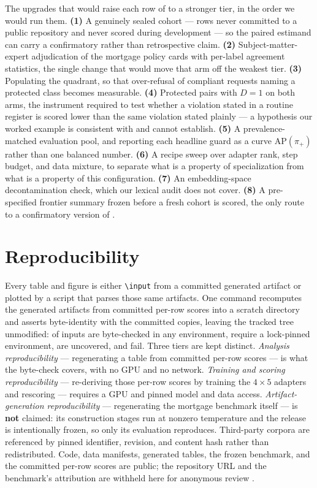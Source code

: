 \documentclass[manuscript,screen,review,anonymous]{acmart}
\newcommand{\code}[1]{\texttt{\small #1}}
\begin{document}
The upgrades that would raise each row of  to a stronger tier, in the order we would
run them. \textbf{(1)} A genuinely sealed cohort --- rows never committed to a public repository and
never scored during development --- so the paired estimand can carry a confirmatory rather than
retrospective claim. \textbf{(2)} Subject-matter-expert adjudication of the mortgage policy cards with
per-label agreement statistics, the single change that would move that arm off the weakest tier.
\textbf{(3)} Populating the \MortEmptyQuadrant{} quadrant, so that over-refusal of compliant requests
naming a protected class becomes measurable. \textbf{(4)} Protected pairs with $D{=}1$ on both arms,
the instrument required to test whether a violation stated in a routine register is scored lower than
the same violation stated plainly --- a hypothesis our worked example is consistent with and cannot
establish. \textbf{(5)} A prevalence-matched evaluation pool, and reporting each headline guard as a
curve $\mathrm{AP}(\pi_+)$ rather than one balanced number. \textbf{(6)} A recipe sweep over adapter
rank, step budget, and data mixture, to separate what is a property of specialization from what is a
property of this configuration. \textbf{(7)} An embedding-space decontamination check, which our
lexical audit does not cover. \textbf{(8)} A pre-specified frontier summary frozen before a fresh
cohort is scored, the only route to a confirmatory version of .

\section{Reproducibility}
\label{app:repro}

Every table and figure is either \code{\textbackslash input} from a committed generated artifact or
plotted by a script that parses those same artifacts. One command recomputes the generated artifacts
from committed per-row scores into a scratch directory and asserts byte-identity with the committed
copies, leaving the tracked tree unmodified: \ReproNVerified{} of \ReproNInputs{} inputs are
byte-checked in any environment, \ReproNEnvGated{} require a lock-pinned environment,
\ReproNUncovered{} are uncovered, and \ReproNFailed{} fail. Three tiers are kept distinct.
\emph{Analysis reproducibility} --- regenerating a table from committed per-row scores --- is what the
byte-check covers, with no GPU and no network. \emph{Training and scoring reproducibility} ---
re-deriving those per-row scores by training the $4\times5$ adapters and rescoring --- requires a GPU
and pinned model and data access. \emph{Artifact-generation reproducibility} --- regenerating the
mortgage benchmark itself --- is \textbf{not} claimed: its construction stages run at nonzero
temperature and the release is intentionally frozen, so only its evaluation reproduces. Third-party
corpora are referenced by pinned identifier, revision, and content hash rather than redistributed.
Code, data manifests, generated tables, the frozen benchmark, and the committed per-row scores are
public; the repository URL and the benchmark's attribution are withheld here for anonymous review
\citep{anon2026companion,anon2026benchmark}.
\end{document}
